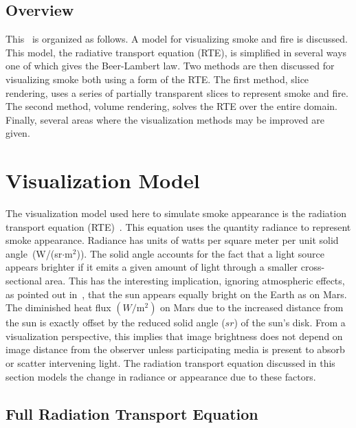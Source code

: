 \subsection{Overview}
This \paper\ is organized as follows.  A model for visualizing smoke and fire is discussed.  This model, the radiative transport equation (RTE), is simplified in several ways one of which gives the Beer-Lambert law.  Two methods are then discussed for visualizing smoke  both using a form of the RTE.  The first method, slice rendering,  uses a series of partially transparent slices to represent smoke and fire. The second method, volume rendering, solves the RTE over the entire domain. Finally, several areas where the visualization methods may be improved are given.

%
%

\section{Visualization Model}
The visualization model used here to simulate smoke appearance is the radiation transport equation (RTE)~\cite{Siegel:2001}.  This equation uses the quantity radiance to represent smoke appearance.  Radiance has units of watts per square meter per unit solid angle~(W/(sr$\cdot$m$^2$)).  The solid angle accounts for the fact that a light source appears brighter if it emits a given amount of light through a smaller cross-sectional area.  This has the interesting implication, ignoring atmospheric effects, as pointed out in~\cite{dutre:2002}, that the sun appears equally bright on the Earth as on Mars.  The diminished heat flux $(W/\mbox{m}^2)$ on Mars due to the increased distance from the sun is exactly offset by the reduced solid angle ($sr$) of the sun's disk.  From a visualization perspective, this implies that image brightness does not depend on image distance from the observer unless  participating media is present to absorb or scatter  intervening light.  The radiation transport equation discussed in this section models the change in radiance or appearance due to these factors.

%
%

\subsection{Full Radiation Transport Equation}
\newcommand{\siga}{ \sigma_a(x) }
\newcommand{\sigt}{ \sigma_t(x) }
\newcommand{\sigs}{ \sigma_s(x) }
\newcommand{\sigts}{ \sigma_t(s) }
\newcommand{\Le}{ C_e(x) }
\newcommand{\Lexo}{ C_e(x,\omega) }
\newcommand{\Lxo}{ C(x,\omega) }
\newcommand{\dLdx}{ \frac{dC}{dx}(x)}
\newcommand{\intf}[2]{ \exp\left({\int_{#1}^{#2} \sigts ds}\right) }
\newcommand{\intff}[2]{ {\int_{#1}^{#2} \sigts ds} }
\newcommand{\intmf}[2]{ \exp\left({-\int_{#1}^{#2} \sigts ds}\right) }
\newcommand{\intmff}[2]{ {-\int_#1^#2 \sigts ds} }

